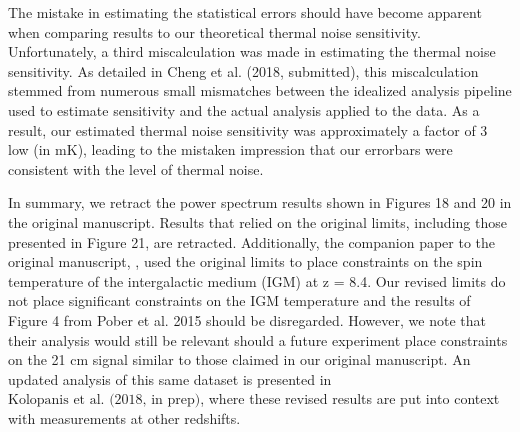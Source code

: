 \documentclass[onecolumn]{emulateapj} \shorttitle{}
\newcommand{\hMpci}{h\ {\rm Mpc}^{-1}}
\newcommand{\kolopaniscitet}{\textrm{Kolopanis et al. (2018, in prep)}}
\newcommand{\chengcitet}{\textrm{Cheng et al. (2018, submitted)}}
\begin{document}
The mistake in estimating the statistical errors should have become apparent when comparing results to our theoretical
thermal noise sensitivity.  Unfortunately, a third miscalculation was made in estimating the thermal noise sensitivity.
As detailed in \chengcitet, this miscalculation stemmed from numerous small mismatches between the idealized analysis
pipeline used to estimate sensitivity and the actual analysis applied to the data.  As a result, our estimated thermal
noise sensitivity was approximately a factor of 3 low (in $\textrm{mK}$), leading to the mistaken impression that our
errorbars were consistent with the level of thermal noise.

In summary, we retract the power spectrum results shown in Figures 18 and 20 in the original manuscript.
Results that relied on the original limits, including those presented in Figure 21,
are retracted.  Additionally, the companion paper to the original manuscript,
\citet{pober_et_al2015}, used the original limits to place constraints on the spin
temperature of the intergalactic medium (IGM) at z = 8.4.  Our revised limits
do not place significant constraints on the IGM temperature and the results of
Figure 4 from Pober et al. 2015 should be disregarded.  However, we note that
their analysis would still be relevant should a future experiment place
constraints on the 21 cm signal similar to those claimed in our original
manuscript.
An updated analysis of this same dataset is presented in $\kolopaniscitet$, where these revised results are put into context with measurements at other 
redshifts.


\nocite{*}


\end{document}
